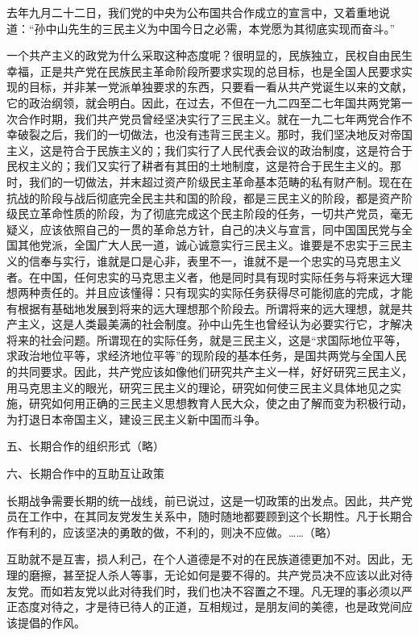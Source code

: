 去年九月二十二日，我们党的中央为公布国共合作成立的宣言中，又着重地说道：“孙中山先生的三民主义为中国今日之必需，本党愿为其彻底实现而奋斗。”

一个共产主义的政党为什么采取这种态度呢？很明显的，民族独立，民权自由民生幸福，正是共产党在民族民主革命阶段所要求实现的总目标，也是全国人民要求实现的目标，并非某一党派单独要求的东西，只要看一看从共产党诞生以来的文献，它的政治纲领，就会明白。因此，在过去，不但在一九二四至二七年国共两党第一次合作时期，我们共产党员曾经坚决实行了三民主义。就在一九二七年两党合作不幸破裂之后，我们的一切做法，也没有违背三民主义。那时，我们坚决地反对帝国主义，这是符合于民族主义的；我们实行了人民代表会议的政治制度，这是符合于民权主义的；我们又实行了耕者有其田的土地制度，这是符合于民生主义的。那时，我们的一切做法，并末超过资产阶级民主革命基本范畴的私有财产制。现在在抗战的阶段与战后彻底完全民主共和国的阶段，都是三民主义的阶段，都是资产阶级民立革命性质的阶段，为了彻底完成这个民主阶段的任务，一切共产党员，毫无疑义，应该依照自己的一贯的革命总方针，自己的决义与宣言，同中国国民党与全国其他党派，全国广大人民一道，诚心诚意实行三民主义。谁要是不忠实于三民主义的信奉与实行，谁就是口是心非，表里不一，谁就不是一个忠实的马克思主义者。在中国，任何忠实的马克思主义者，他是同时具有现时实际任务与将来远大理想两种责任的。并且应该懂得：只有现实的实际任务获得尽可能彻底的完成，才能有根据有基础地发展到将来的远大理想那个阶段去。所谓将来的远大理想，就是共产主义，这是人类最美满的社会制度。孙中山先生也曾经认为必要实行它，才解决将来的社会问题。所谓现在的实际任务，就是三民主义，这是“求国际地位平等，求政治地位平等，求经济地位平等”的现阶段的基本任务，是国共两党与全国人民的共同要求。因此，共产党应该如像他们研究共产主义一样，好好研究三民主义，用马克思主义的眼光，研究三民主义的理论，研究如何使三民主义具体地见之实施，研究如何用正确的三民主义思想教育人民大众，使之由了解而变为积极行动，为打退日本帝国主义，建设三民主义新中国而斗争。

五、长期合作的组织形式（略）

六、长期合作中的互助互让政策

长期战争需要长期的统一战线，前已说过，这是一切政策的出发点。因此，共产党员在工作中，在其同友党发生关系中，随时随地都要顾到这个长期性。凡于长期合作有利的，应该坚决的勇敢的做，不利的，则决不应做。……（略）

互助就不是互害，损人利己，在个人道德是不对的在民族道德更加不对。因此，无理的磨擦，甚至捉人杀人等事，无论如何是要不得的。共产党员决不应该以此对待友党。而如若友党以此对待我们时，我们也决不容置之不理。凡无理的事必须以严正态度对待之，才是待已待人的正道，互相规过，是朋友间的美德，也是政党间应该提倡的作风。

